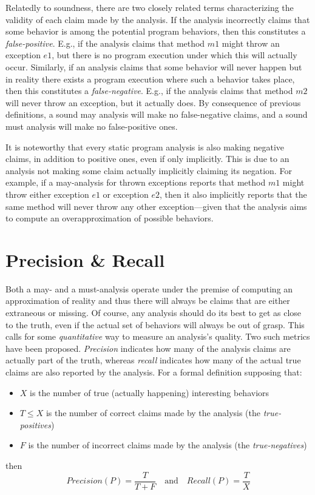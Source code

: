 Relatedly to soundness, there are two closely related terms characterizing the validity of each claim made by the analysis. If the analysis incorrectly claims that some behavior is among the potential program behaviors, then this constitutes a \emph{false-positive}. E.g., if the analysis claims that method $m1$ might throw an exception $e1$, but there is no program execution under which this will actually occur. Similarly, if an analysis claims that some behavior will never happen but in reality there exists a program execution where such a behavior takes place, then this constitutes a \emph{false-negative}. E.g., if the analysis claims that method $m2$ will never throw an exception, but it actually does. By consequence of previous definitions, a sound may analysis will make no false-negative claims, and a sound must analysis will make no false-positive ones.

It is noteworthy that every static program analysis is also making negative claims, in addition to positive ones, even if only implicitly. This is due to an analysis not making some claim actually implicitly claiming its negation. For example, if a may-analysis for thrown exceptions reports that method $m1$ might throw either exception $e1$ or exception $e2$, then it also implicitly reports that the same method will never throw any other exception---given that the analysis aims to compute an overapproximation of possible behaviors.


\section{Precision \& Recall}
\label{sec:intro:precision-recall}

Both a may- and a must-analysis operate under the premise of computing an approximation of reality and thus there will always be claims that are either extraneous or missing. Of course, any analysis should do its best to get as close to the truth, even if the actual set of behaviors will always be out of grasp. This calls for some \emph{quantitative} way to measure an analysis's quality. Two such metrics have been proposed. \emph{Precision} indicates how many of the analysis claims are actually part of the truth, whereas \emph{recall} indicates how many of the actual true claims are also reported by the analysis. For a formal definition supposing that:
\begin{itemize}
\item $X$ is the number of true (actually happening) interesting behaviors
\item $T \leq X$ is the number of correct claims made by the analysis (the \emph{true-positives})
\item $F$ is the number of incorrect claims made by the analysis (the \emph{true-negatives})
\end{itemize}
then
\[
Precision(P) = \frac{T}{T + F}
\quad \textrm{and} \quad
Recall(P) = \frac{T}{X}
\]

